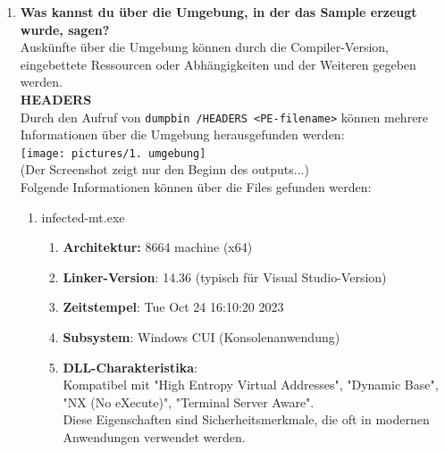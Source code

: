 \documentclass{article}
\begin{document}
\begin{enumerate}
\begin{lstlisting}[language=c]
			Time Type        Size      RVA  Pointer
			-------- ------- -------- -------- --------
			6537D1B0 cv            66 00003464     2264    Format: RSDS, {6F72B84A-D687-4743-A104-E88EF40E7E96}, 4, C:\Users\admin_sin\Desktop\rev3-s2210239021\infected\x64\Release\infected.pdb
			6537D1B0 feat          14 000034CC     22CC    Counts: Pre-VC++ 11.00=0, C/C++=30, /GS=30, /sdl=1, guardN=29
			6537D1B0 coffgrp      284 000034E0     22E0    4C544347 (LTCG)
			6537D1B0 iltcg          0 00000000        0
			
		\end{lstlisting}
		
		\noindent Dies ist in allen Files gleich herauszulesen.\\
		
		\item \textbf{Was kannst du über die Umgebung, in der das Sample erzeugt wurde, sagen?}\\
		Auskünfte über die Umgebung können durch die Compiler-Version, eingebettete Ressourcen oder Abhängigkeiten und der Weiteren gegeben werden.\\
		\textbf{HEADERS}\\
		Durch den Aufruf von \texttt{dumpbin /HEADERS <PE-filename>} können mehrere Informationen über die Umgebung herausgefunden werden:\\
		\texttt{[image: pictures/1. umgebung]}\\
		(Der Screenshot zeigt nur den Beginn des outputs...)\\
		Folgende Informationen können über die Files gefunden werden:\\
		\begin{enumerate}
			\item infected-mt.exe
			\begin{enumerate}
				\item \textbf{Architektur:} 8664 machine (x64)
				\item \textbf{Linker-Version}: 14.36 (typisch für Visual Studio-Version)
				\item \textbf{Zeitstempel}: Tue Oct 24 16:10:20 2023
				\item \textbf{Subsystem}: Windows CUI (Konsolenanwendung)
				\item \textbf{DLL-Charakteristika}:\\
				Kompatibel mit "High Entropy Virtual Addresses", "Dynamic Base", "NX (No eXecute)", "Terminal Server Aware".\\
				Diese Eigenschaften sind Sicherheitsmerkmale, die oft in modernen Anwendungen verwendet werden.

\end{enumerate}
\end{enumerate}
\end{enumerate}
\end{document}
